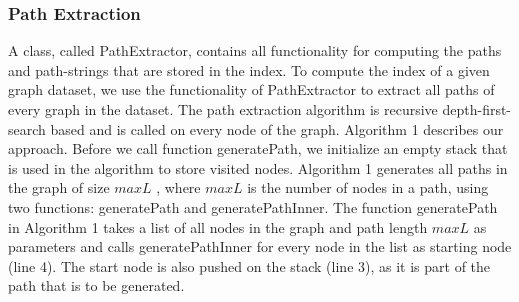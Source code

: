 \documentclass{l4proj}
\theoremstyle{definition}
\begin{document}
\subsubsection{Path Extraction}
\label{path-index:path-extraction}
A class, called \textrm{PathExtractor}, contains all functionality for computing the paths and path-strings that are stored in the index. To compute the index of a given graph dataset, we use the functionality of \textrm{PathExtractor} to extract all paths of every graph in the dataset. The path extraction algorithm is recursive depth-first-search based and is called on every node of the graph. Algorithm 1 describes our approach. Before we call function \textrm{generatePath}, we initialize an empty stack that is used in the algorithm to store visited nodes. \textrm{Algorithm 1} generates all paths in the graph of size $maxL$ , where $maxL$ is the number of nodes in a path, using two functions: \textrm{generatePath} and \textrm{generatePathInner}. The function \textrm{generatePath} in \textrm{Algorithm 1} takes a list of all nodes in the graph and path length $maxL$ as parameters and calls \textrm{generatePathInner} for every node in the list as starting node (line 4). The start node is also pushed on the stack (line 3), as it is part of the path that is to be generated. \par
\end{document}
